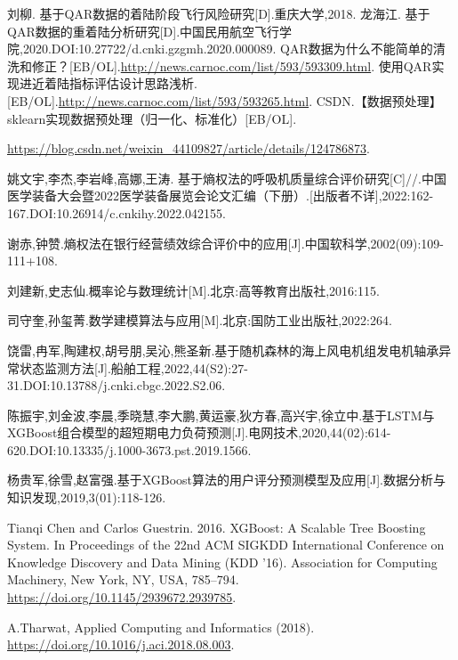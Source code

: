 \documentclass{MathorCupModeling}
\begin{document}
	\newpage
	\begin{spacing}{1.08}
	\begin{thebibliography}{99}
	刘柳. 基于QAR数据的着陆阶段飞行风险研究[D].重庆大学,2018.
	龙海江. 基于QAR数据的重着陆分析研究[D].中国民用航空飞行学院,2020.DOI:10.27722/d.cnki.gzgmh.2020.000089.
	QAR数据为什么不能简单的清洗和修正？[EB/OL].\url{http://news.carnoc.com/list/593/593309.html}.
	使用QAR实现进近着陆指标评估设计思路浅析.[EB/OL].\url{http://news.carnoc.com/list/593/593265.html}.
	CSDN.【数据预处理】sklearn实现数据预处理（归一化、标准化）[EB/OL].
	
	\url{https://blog.csdn.net/weixin_44109827/article/details/124786873}.

	姚文宇,李杰,李岩峰,高娜,王涛. 基于熵权法的呼吸机质量综合评价研究[C]//.中国医学装备大会暨2022医学装备展览会论文汇编（下册）.[出版者不详],2022:162-167.DOI:10.26914/c.cnkihy.2022.042155.

	谢赤,钟赞.熵权法在银行经营绩效综合评价中的应用[J].中国软科学,2002(09):109-111+108.

	刘建新,史志仙.概率论与数理统计[M].北京:高等教育出版社,2016:115.

	司守奎,孙玺菁.数学建模算法与应用[M].北京:国防工业出版社,2022:264.

	饶雷,冉军,陶建权,胡号朋,吴沁,熊圣新.基于随机森林的海上风电机组发电机轴承异常状态监测方法[J].船舶工程,2022,44(S2):27-31.DOI:10.13788/j.cnki.cbgc.2022.S2.06.

	陈振宇,刘金波,李晨,季晓慧,李大鹏,黄运豪,狄方春,高兴宇,徐立中.基于LSTM与XGBoost组合模型的超短期电力负荷预测[J].电网技术,2020,44(02):614-620.DOI:10.13335/j.1000-3673.pst.2019.1566.

	杨贵军,徐雪,赵富强.基于XGBoost算法的用户评分预测模型及应用[J].数据分析与知识发现,2019,3(01):118-126.

	Tianqi Chen and Carlos Guestrin. 2016. XGBoost: A Scalable Tree Boosting System. In Proceedings of the 22nd ACM SIGKDD International Conference on Knowledge Discovery and Data Mining (KDD '16). Association for Computing Machinery, New York, NY, USA, 785–794. \url{https://doi.org/10.1145/2939672.2939785}.

	A.Tharwat, Applied Computing and Informatics (2018). \url{https://doi.org/10.1016/j.aci.2018.08.003}.

	\end{thebibliography}
	\end{spacing}
	\newpage
\end{document}
